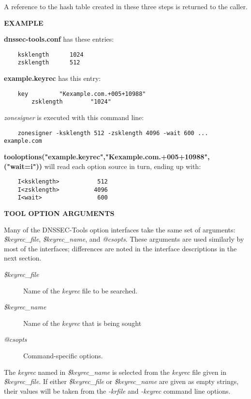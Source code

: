 A reference to the hash table created in these three steps is returned to the
caller.


{\bf EXAMPLE}

{\bf dnssec-tools.conf} has these entries:

\begin{verbatim}
    ksklength      1024
    zsklength      512
\end{verbatim}

{\bf example.keyrec} has this entry:

\begin{verbatim}
    key         "Kexample.com.+005+10988"
        zsklength        "1024"
\end{verbatim}

{\it zonesigner} is executed with this command line:

\begin{verbatim}
    zonesigner -ksklength 512 -zsklength 4096 -wait 600 ...  example.com
\end{verbatim}

{\bf tooloptions("example.keyrec","Kexample.com.+005+10988",("wait=i"))}
will read each option source in turn, ending up with:
\begin{verbatim}
    I<ksklength>           512
    I<zsklength>          4096
    I<wait>                600
\end{verbatim}


{\bf TOOL OPTION ARGUMENTS}

Many of the DNSSEC-Tools option interfaces take the same set of arguments:
{\it \$keyrec\_file}, {\it \$keyrec\_name}, and {\it @csopts}.  These arguments
are used similarly by most of the interfaces; differences are noted in the
interface descriptions in the next section.

\begin{description}

\item [{\it \$keyrec\_file}] Name of the {\it keyrec} file to be searched.

\item [{\it \$keyrec\_name}] Name of the {\it keyrec} that is being sought

\item [{\it @csopts}] Command-specific options.

\end{description}

The {\it keyrec} named in {\it \$keyrec\_name} is selected from the {\it
keyrec} file given in {\it \$keyrec\_file}.  If either {\it \$keyrec\_file}
or {\it \$keyrec\_name} are given as empty strings, their values will be taken
from the {\it -krfile} and {\it -keyrec} command line options.

